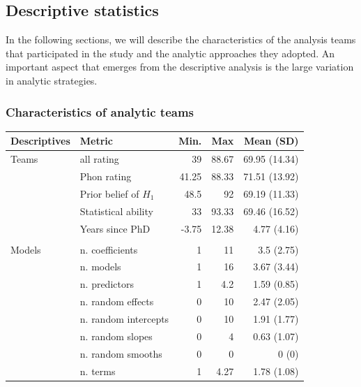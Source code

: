 \documentclass[Review,times,sageh]{sagej}
\begin{document}
\hypertarget{descriptive-statistics-1}{%
\subsection{Descriptive statistics}\label{descriptive-statistics-1}}

In the following sections, we will describe the characteristics of the analysis teams that participated in the study and the analytic approaches they adopted.
An important aspect that emerges from the descriptive analysis is the large variation in analytic strategies.

\hypertarget{characteristics-of-analytic-teams}{%
\subsubsection{Characteristics of analytic teams}\label{characteristics-of-analytic-teams}}

\phantom{.}

\begin{tabular}{llrrr}
\toprule
Descriptives & Metric & Min. & Max & Mean (SD)\\
\midrule
Teams & all rating & 39 & 88.67 & 69.95 (14.34)\\
 & Phon rating & 41.25 & 88.33 & 71.51 (13.92)\\
 & Prior belief of $H_{1}$ & 48.5 & 92 & 69.19 (11.33)\\
 & Statistical ability & 33 & 93.33 & 69.46 (16.52)\\
 & Years since PhD & -3.75 & 12.38 & 4.77 (4.16)\\
 &  &  &  & \\
Models & n. coefficients & 1 & 11 & 3.5 (2.75)\\
 & n. models & 1 & 16 & 3.67 (3.44)\\
 & n. predictors & 1 & 4.2 & 1.59 (0.85)\\
 & n. random effects & 0 & 10 & 2.47 (2.05)\\
 & n. random intercepts & 0 & 10 & 1.91 (1.77)\\
 & n. random slopes & 0 & 4 & 0.63 (1.07)\\
 & n. random smooths & 0 & 0 & 0 (0)\\
 & n. terms & 1 & 4.27 & 1.78 (1.08)\\
\bottomrule
\end{tabular}
\end{document}

